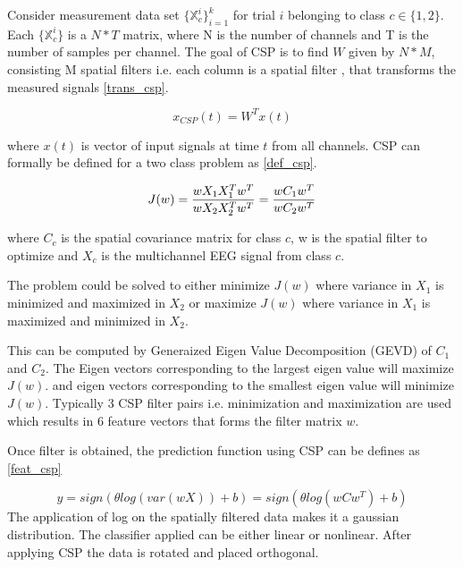 Consider measurement data set $\{\mathbb{X}^{i}_{c}\}^{k}_{i=1}$ for trial $i$ belonging to class $c \in\{1,2\}$. Each $\{\mathbb{X}^{i}_{c}\}$ is a $N * T$ matrix, where
N is the number of channels and T is the number of samples per channel. The goal of CSP is to find $W$ given by $N * M$, consisting M spatial filters i.e. each column is a spatial
filter , that transforms the measured signals \ref*{trans_csp}.

\begin{equation} \label{eq:trans_csp}
    x_{CSP}(t) = W^{T}x(t)
\end{equation}

where $x(t)$ is vector of input signals at time $t$ from all channels. CSP can formally be defined for a two class problem as \ref{def_csp}.

\begin{equation} \label{eq:def_csp}
    J(w) = \frac{wX_{1}X_{1}^Tw^T}{wX_{2}X_{2}^Tw^T} \\
         = \frac{wC_{1}w^T}{wC_{2}w^T}
\end{equation}

where $C_{c}$ is the spatial covariance matrix for class $c$, w is the spatial filter to optimize and $X_{c}$ is the multichannel EEG signal from class $c$.

The problem could be solved to either minimize $J(w)$ where variance in $X_{1}$ is minimized and maximized in $X_{2}$ or maximize $J(w)$ where variance in $X_{1}$ is 
maximized and minimized in $X_{2}$.

This can be computed by Generaized Eigen Value Decomposition (GEVD) of $C_{1}$ and $C_{2}$. The Eigen vectors corresponding to the largest eigen value will maximize $J(w)$.
and eigen vectors corresponding to the smallest eigen value will minimize $J(w)$. Typically 3 CSP filter pairs i.e. minimization and maximization are used which results in
6 feature vectors that forms the filter matrix $w$.

Once filter is obtained, the prediction function using CSP can be defines as \ref*{feat_csp}

\begin{equation} \label{eq:feat_csp}
    y = sign(\theta log(var(wX)) +b) = sign(\theta log(wCw^T) + b)
\end{equation}
The application of log on the spatially filtered data makes it a gaussian distribution. The classifier applied can be either linear or nonlinear. After applying CSP 
the data is rotated and placed orthogonal.

